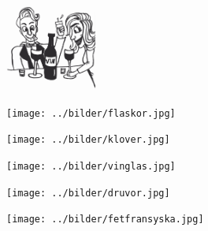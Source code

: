 $  $%
%

\begin{figure}[!b]
\begin{center}
\includegraphics[width=3cm]{../bilder/fardigabilder/BilderTillKapitel/vinvisor.png} 
\end{center}
\end{figure}
\sclearpage

\sclearpage

\sclearpage

\begin{figure}[!b]
\begin{center}
\texttt{[image: ../bilder/flaskor.jpg]} 
\end{center}
\end{figure}
\sclearpage

%
\begin{figure}[!b]
\begin{center}
\texttt{[image: ../bilder/klover.jpg]} 
\end{center}
\end{figure}
\sclearpage

\begin{figure}[!b]
\begin{center}
\texttt{[image: ../bilder/vinglas.jpg]} 
\end{center}
\end{figure}
\sclearpage

\sclearpage

\sclearpage

%
\sclearpage

\begin{figure}[!b]
\begin{center}
\texttt{[image: ../bilder/druvor.jpg]} 
\end{center}
\end{figure}
\sclearpage

\begin{figure}[!b]
\begin{center}
\texttt{[image: ../bilder/fetfransyska.jpg]} 
\end{center}
\end{figure}
\sclearpage
%

